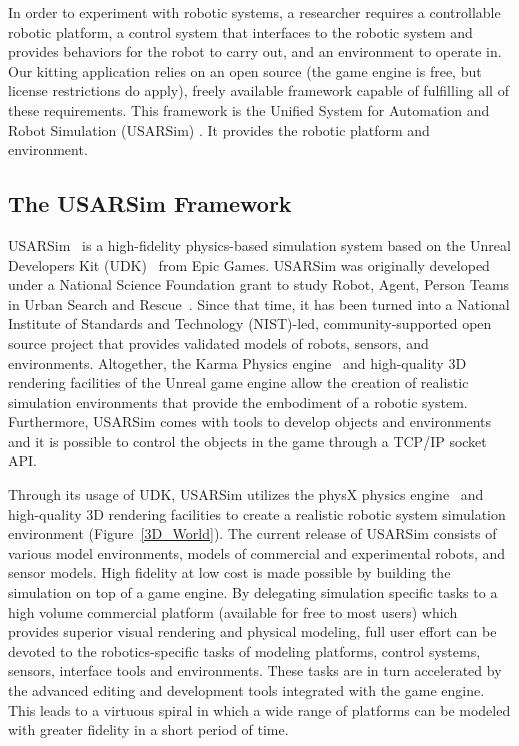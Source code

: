 \label{sect:simulation}
In order to experiment with robotic systems, a researcher requires a controllable robotic platform, a control system that interfaces to the robotic system and provides behaviors for the robot to carry out, and an environment to operate in. Our kitting application relies on an open source (the game engine is free, but license restrictions do apply), freely available framework capable of fulfilling all of these requirements. This framework is the Unified System for Automation and Robot Simulation (USARSim) \cite{USARSimWeb}. It provides the robotic platform and environment.

\subsection{The USARSim Framework}

USARSim~\cite{CARPIN.LNAI.2006,WANG.WSC.2003} is a high-fidelity physics-based simulation system based on the Unreal Developers Kit (UDK)~\cite{UDKWeb} from Epic Games. USARSim was originally developed under a National Science Foundation grant to study Robot, Agent, Person Teams in Urban Search and Rescue~\cite{LEWIS.ICHC.2003}. Since that time, it has been turned into a National Institute of Standards and Technology (NIST)-led, community-supported open source project that provides validated models of robots, sensors, and environments. Altogether, the Karma Physics engine~\cite{KarmEngine} and high-quality 3D rendering facilities of the Unreal game engine allow the creation of realistic simulation environments that provide the embodiment of a robotic system. Furthermore, USARSim comes with tools to develop objects and environments and it is possible to control the objects in the game through a TCP/IP socket API.

Through its usage of UDK, USARSim utilizes the physX physics engine~\cite{physXWeb} and high-quality 3D rendering facilities to create a realistic robotic system simulation environment (Figure~\ref{3D_World}). The current release of USARSim consists of various model environments, models of commercial and experimental robots, and sensor models. High fidelity at low cost is made possible by building the simulation on top of a game engine. By delegating  simulation specific tasks to a high volume commercial platform (available for free to most users) which provides superior visual rendering and physical modeling, full user effort can be devoted to the robotics-specific tasks of modeling platforms, control systems, sensors, interface tools and environments. These tasks are in turn accelerated by the advanced editing and development tools integrated with the game engine. This leads to a virtuous spiral in which a wide range of platforms can be modeled with greater fidelity in a short period of time.

